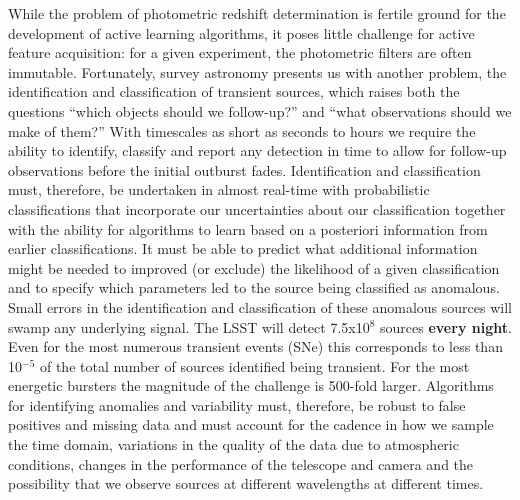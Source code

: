 \documentclass[useAMS,usenatbib,tightenlines,11pt,preprint]{aastex}
\begin{document}
While the problem of photometric redshift determination is fertile ground for
the development of active learning algorithms, it poses little challenge for
active feature acquisition: for a given experiment, the photometric filters are
often immutable.  Fortunately, survey astronomy presents us with another 
problem, the identification and classification of transient sources,
which raises both the questions ``which objects should we
follow-up?'' and ``what observations should we make of them?''
With timescales as short as seconds to hours we require the ability to
identify, classify and report any detection in time to allow for
follow-up observations before the initial outburst
fades. Identification and classification must, therefore, be
undertaken in almost real-time with probabilistic classifications that
incorporate our uncertainties about our classification together with
the ability for algorithms to learn based on a posteriori information
from earlier classifications. It must be able to predict what
additional information might be needed to improved (or exclude) the
likelihood of a given classification and to specify which parameters
led to the source being classified as anomalous. Small errors in the
identification and classification of these anomalous sources will
swamp any underlying signal. The LSST will detect 7.5x10$^8$ sources
{\bf every night}. Even for the most numerous transient events (SNe)
this corresponds to less than 10$^{-5}$ of the total number of sources
identified being transient. For the most energetic bursters the
magnitude of the challenge is 500-fold larger.  Algorithms for
identifying anomalies and variability must, therefore, be robust to
false positives and missing data and must account for the cadence in
how we sample the time domain, variations in the quality of the data
due to atmospheric conditions, changes in the performance of the
telescope and camera and the possibility that we observe sources at
different wavelengths at different times.
\end{document}
